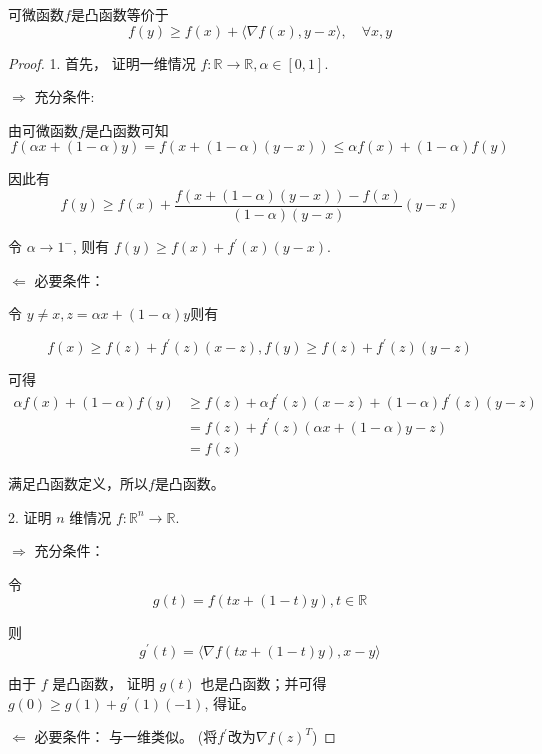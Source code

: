 \begin{theorem}
    \label{Theorem:ConvexDiffential}

    可微函数$f$是凸函数等价于
    \begin{equation} f(y) \geq f(x)+\langle\nabla f(x), y-x\rangle, \quad \forall x, y \end{equation}
\end{theorem}

\begin{proof}
    1. 首先， 证明一维情况 $ f: \mathbb{R} \rightarrow \mathbb{R}, \alpha \in[0,1] $.

    $ \Rightarrow  $ 充分条件: 
    
    由可微函数$f$是凸函数可知
    \begin{equation} f(\alpha x+(1-\alpha) y)=f(x+(1-\alpha)(y-x)) \leq \alpha f(x)+(1-\alpha) f(y) \end{equation}
    
    因此有
    \begin{equation} f(y) \geq f(x)+\frac{f(x+(1-\alpha)(y-x))-f(x)}{(1-\alpha)(y-x)}(y-x) \end{equation}

    令 $ \alpha \rightarrow 1^- $, 则有 $ f(y) \geq f(x)+f^{\prime}(x)(y-x) $.

    $ \Leftarrow  $ 必要条件：
    
    令 $ y \neq x, z=\alpha x+(1-\alpha) y$则有

    \begin{equation}  f(x) \geq f(z)+f^{\prime}(z)(x-z), f(y) \geq f(z)+f^{\prime}(z)(y-z)  \end{equation}

    可得 
    \begin{equation}\begin{aligned}
        \alpha f(x)+(1-\alpha) f(y) &\geq f(z)+\alpha f^{\prime}(z)(x-z)+(1-\alpha) f^{\prime}(z)(y-z) \\
        &=f(z)+f^{\prime}(z)(\alpha x+(1-\alpha) y-z) \\
        &=f(z)
    \end{aligned}
    \end{equation}

    满足凸函数定义，所以$f$是凸函数。

    2. 证明 $ n $ 维情况 $ f: \mathbb{R}^{n} \rightarrow \mathbb{R} $.

    $ \Rightarrow $ 充分条件：
    
    令 \begin{equation} g(t)=f(t x+(1-t) y), t \in \mathbb{R} \end{equation}

    则\begin{equation} g^{\prime}(t)=\langle\nabla f(t x+(1-t) y), x-y\rangle \end{equation}

    由于 $ f $ 是凸函数， 证明 $ g(t) $ 也是凸函数；并可得 $ g(0) \geq g(1)+g^{\prime}(1)(-1) $, 得证。

    $ \Leftarrow $ 必要条件：
    与一维类似。 (将$f^{\prime}$改为$\nabla f(z)^T$) 
\end{proof}

